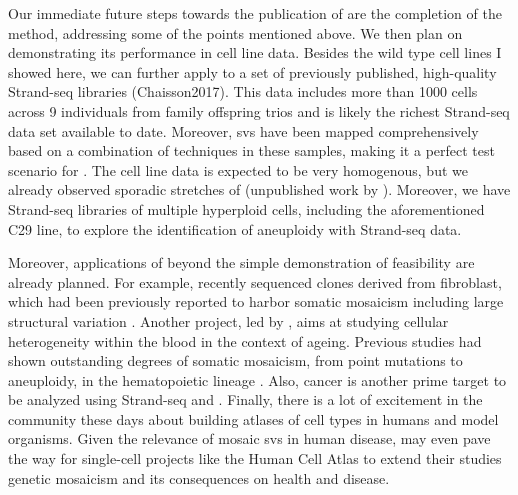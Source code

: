 Our immediate future steps towards the publication of \mc are the completion of
the method, addressing some of the points mentioned above. We then plan on
demonstrating its performance in cell line data. Besides the 
wild type cell lines I showed here, we can further apply \mc to a set of previously
published, high-quality Strand-seq libraries (Chaisson2017). This data
includes more than 1000 cells across 9 individuals from family offspring trios and
is likely the richest Strand-seq data set available to date. Moreover, \acp{sv}
have been mapped comprehensively based on a combination of techniques in these
samples, making it a perfect test scenario for \mc. The cell line data is
expected to be very homogenous, but we already observed sporadic stretches of
\loh (unpublished work by \david). Moreover, we have Strand-seq libraries of
multiple hyperploid cells, including the aforementioned \rpe C29
line, to explore the identification of aneuploidy with Strand-seq data.

Moreover, applications of \mc beyond the simple demonstration of feasibility are
already planned. For example, \ashley recently sequenced clones derived
from fibroblast, which had been previously reported to harbor somatic mosaicism
including large structural variation \citep{Saini2016}. Another project, led by
\karen, aims at studying cellular heterogeneity within the blood in the context
of ageing. Previous studies had shown outstanding degrees of somatic mosaicism,
from point mutations to aneuploidy, in the hematopoietic lineage
\citep{Razzaghian2010,Holstege2014}. Also, cancer is another prime target to
be analyzed using Strand-seq and \mc. Finally, there is a lot of excitement in
the community these days about building atlases of cell types in humans and model
organisms. Given the relevance of mosaic \acp{sv} in human disease, \mc may even
pave the way for single-cell projects like the Human Cell Atlas \citep{Regev2017}
to extend their studies genetic mosaicism and its consequences on health and disease.
